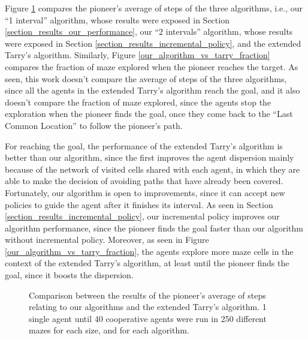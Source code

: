 Figure \ref{our_algorithm_vs_tarry_steps} compares the pioneer's average of steps of the three algorithms, i.e., our ``1 interval'' algorithm, whose results were exposed in Section \ref{section_results_our_performance}, our ``2 intervals'' algorithm, whose results were exposed in Section \ref{section_results_incremental_policy}, and the extended Tarry's algorithm. Similarly, Figure \ref{our_algorithm_vs_tarry_fraction} compares the fraction of maze explored when the pioneer reaches the target. As seen, this work doesn't compare the average of steps of the three algorithms, since all the agents in the extended Tarry's algorithm reach the goal, and it also doesn't compare the fraction of maze explored, since the agents stop the exploration when the pioneer finds the goal, once they come back to the ``Last Common Location'' to follow the pioneer's path.

For reaching the goal, the performance of the extended Tarry's algorithm is better than our algorithm, since the first improves the agent dispersion mainly because of the network of visited cells shared with each agent, in which they are able to make the decision of avoiding paths that have already been covered. Fortunately, our algorithm is open to improvements, since it can accept new policies to guide the agent after it finishes its interval. As seen in Section \ref{section_results_incremental_policy}, our incremental policy improves our algorithm performance, since the pioneer finds the goal faster than our algorithm without incremental policy. Moreover, as seen in Figure \ref{our_algorithm_vs_tarry_fraction}, the agents explore more maze cells in the context of the extended Tarry's algorithm, at least until the pioneer finds the goal, since it boosts the dispersion.

\begin{figure}
    \centering
    \qquad
    \qquad
    \newline
    \qquad
    \caption{Comparison between the results of the pioneer's average of steps relating to our algorithms and the extended Tarry's algorithm. 1 single agent until 40 cooperative agents were run in 250 different mazes for each size, and for each algorithm.}
    \label{our_algorithm_vs_tarry_steps}
\end{figure}

